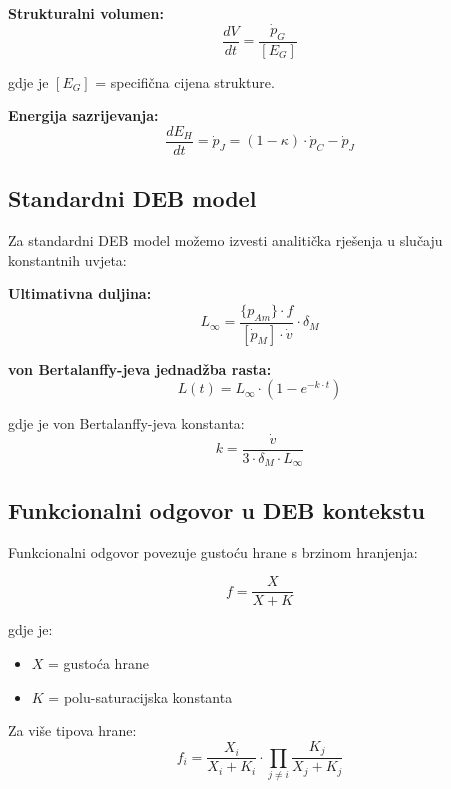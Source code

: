 \documentclass[11pt,oneside]{book}
\begin{document}
\textbf{Strukturalni volumen:}
\begin{equation}
	\frac{dV}{dt} = \frac{\dot{p}_G}{[E_G]}
\end{equation}

gdje je $[E_G]$ = specifična cijena strukture.

\textbf{Energija sazrijevanja:}
\begin{equation}
	\frac{dE_H}{dt} = \dot{p}_J = (1-\kappa) \cdot \dot{p}_C - \dot{p}_J
\end{equation}

\subsection{Standardni DEB model}

Za standardni DEB model možemo izvesti analitička rješenja u slučaju konstantnih uvjeta:

\textbf{Ultimativna duljina:}
\begin{equation}
	L_\infty = \frac{\{p_{Am}\} \cdot f}{[\dot{p}_M] \cdot \dot{v}} \cdot \delta_M
\end{equation}

\textbf{von Bertalanffy-jeva jednadžba rasta:}
\begin{equation}
	L(t) = L_\infty \cdot (1 - e^{-k \cdot t})
\end{equation}

gdje je von Bertalanffy-jeva konstanta:
\begin{equation}
	k = \frac{\dot{v}}{3 \cdot \delta_M \cdot L_\infty}
\end{equation}

\subsection{Funkcionalni odgovor u DEB kontekstu}

Funkcionalni odgovor povezuje gustoću hrane s brzinom hranjenja:

\begin{equation}
	f = \frac{X}{X + K}
\end{equation}

gdje je:
\begin{itemize}
	\item $X$ = gustoća hrane
	\item $K$ = polu-saturacijska konstanta
\end{itemize}

Za više tipova hrane:
\begin{equation}
	f_i = \frac{X_i}{X_i + K_i} \cdot \prod_{j \neq i} \frac{K_j}{X_j + K_j}
\end{equation}
\end{document}
